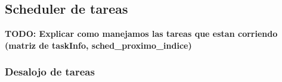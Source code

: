 \subsection{Scheduler de tareas}



{\LARGE \textbf{TODO: Explicar como manejamos las tareas que estan corriendo (matriz de taskInfo, sched\_proximo\_indice)}}


\subsubsection{Desalojo de tareas}
\label{sec-desalojo}
